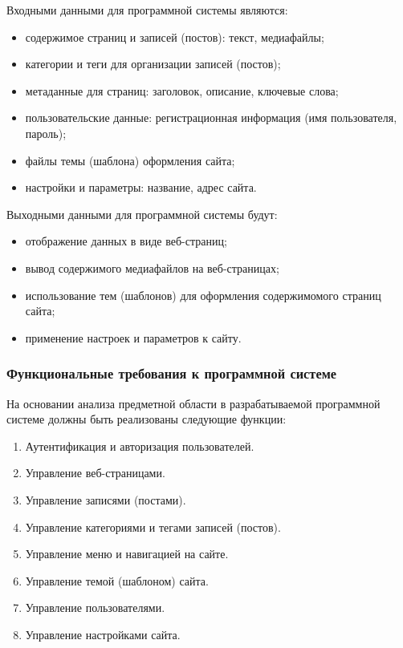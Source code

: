 Входными данными для программной системы являются:
\begin{itemize}
	\item содержимое страниц и записей (постов): текст, медиафайлы;
	\item категории и теги для организации записей (постов);
	\item метаданные для страниц: заголовок, описание, ключевые слова;
	\item пользовательские данные: регистрационная информация (имя пользователя, пароль);
	\item файлы темы (шаблона) оформления сайта;
	\item настройки и параметры: название, адрес сайта.
\end{itemize}

Выходными данными для программной системы будут:
\begin{itemize}
	\item отображение данных в виде веб-страниц;
	\item вывод содержимого медиафайлов на веб-страницах;
	\item использование тем (шаблонов) для оформления содержимомого страниц сайта;
	\item применение настроек и параметров к сайту.
\end{itemize}

\subsubsection{Функциональные требования к программной системе}

На основании анализа предметной области в разрабатываемой программной системе должны быть реализованы следующие функции:
\begin{enumerate}
	\item Аутентификация и авторизация пользователей.
	\item Управление веб-страницами.
	\item Управление записями (постами).
	\item Управление категориями и тегами записей (постов).
	\item Управление меню и навигацией на сайте.
	\item Управление темой (шаблоном) сайта.
	\item Управление пользователями.
	\item Управление настройками сайта.
\end{enumerate}

